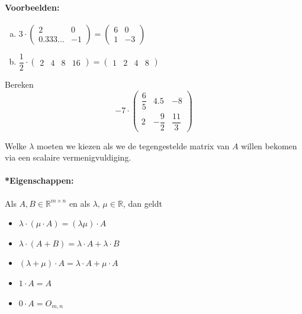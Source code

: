 \documentclass[12pt,twoside]{article}
\begin{document}
\paragraph*{Voorbeelden:}
\begin{enumerate}[(a)]
\item
  $3 \cdot
  \begin{pmatrix}
    2           & 0 \\
    0.333\ldots & -1
  \end{pmatrix}
  =
  \begin{pmatrix}
    6           & 0 \\
    1           & -3
  \end{pmatrix}
  $
\item
  $\dfrac{1}{2} \cdot
  \begin{pmatrix}
    2           & 4 & 8 & 16
  \end{pmatrix}
  =
  \begin{pmatrix}
    1           & 2 & 4 & 8
  \end{pmatrix}
  $
\end{enumerate}

\begin{oefening}
  Bereken
  $$
  -7 \cdot
  \begin{pmatrix}
    \dfrac{6}{5} & 4.5 & -8\\
    2 & -\dfrac{9}{2} & \dfrac{11}{3}
  \end{pmatrix}
  $$
\end{oefening}

\begin{oefening}
  Welke $\lambda$ moeten we kiezen als we de tegengestelde matrix van $A$ willen bekomen via een scalaire vermenigvuldiging.
\end{oefening}

\paragraph*{*Eigenschappen:}
Als $A,B \in \mathbb{R}^{m \times n}$ en als $\lambda,\,\mu \in \mathbb{R}$, dan geldt
\begin{itemize}
\item $\lambda \cdot (\mu \cdot A) = (\lambda \mu) \cdot A$
\item $\lambda \cdot (A + B) = \lambda \cdot A + \lambda \cdot B$
\item $(\lambda + \mu) \cdot A = \lambda \cdot A + \mu \cdot A$
\item $1 \cdot A = A$
\item $0 \cdot A = O_{m,n}$
\end{itemize}
\end{document}
